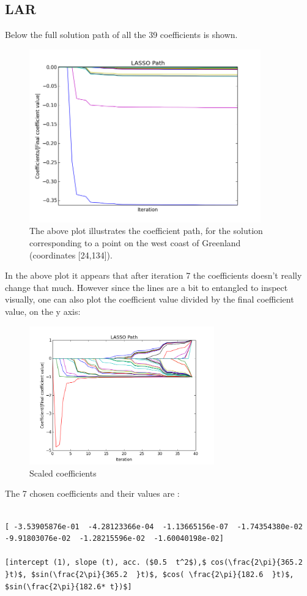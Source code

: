 \pagebreak
\subsection{LAR}

Below the full solution path of all the 39 coefficients is shown.
\begin{figure}[H]
\center
\includegraphics[width=10cm]{figures/lasso_path.png}
\caption{The above plot illustrates the coefficient path, for the solution corresponding to a point on the west coast of Greenland (coordinates [24,134]).}
\end{figure}
In the above plot it appears that after iteration 7 the coefficients doesn't really change that much. However since the lines are a bit to entangled to inspect visually, one can also plot the coefficient value divided by the final coefficient value, on the y axis:
\begin{figure}[H]
\center
\includegraphics[width=8cm]{figures/lasso_path_scaled.png}
\caption{Scaled coefficients}
\end{figure}
\pagebreak
The 7 chosen coefficients and their values are :
\begin{lstlisting}[mathescape]

[ -3.53905876e-01  -4.28123366e-04  -1.13665156e-07  -1.74354380e-02  -9.91803076e-02  -1.28215596e-02  -1.60040198e-02]

[intercept (1), slope (t), acc. ($0.5  t^2$),$ cos(\frac{2\pi}{365.2 }t)$, $sin(\frac{2\pi}{365.2  }t)$, $cos( \frac{2\pi}{182.6  }t)$, $sin(\frac{2\pi}{182.6* t})$]
\end{lstlisting}
